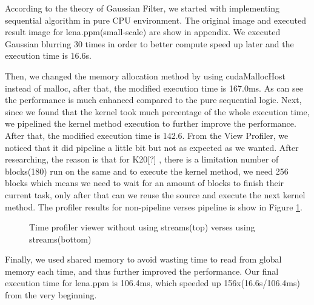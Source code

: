 \documentclass[journal,11pt,onecolumn,draftclsnofoot]{ieeeconf}  %
\begin{document}
According to the theory of Gaussian Filter, we started with implementing sequential algorithm in pure CPU environment. The original image and executed result image for lena.ppm(small-scale) are show in appendix. We executed Gaussian blurring 30 times in order to better compute speed up later and the execution time is 16.6s.

Then, we changed the memory allocation method by using cudaMallocHost instead of malloc, after that, the modified execution time is 167.0ms. As can see the performance is much enhanced compared to the pure sequential logic.
Next, since we found that the kernel took much percentage of the whole execution time, we pipelined the kernel method execution to further improve the performance. After that, the modified execution time is 142.6. From the View Profiler, we noticed that it did pipeline a little bit but not as expected as we wanted. After researching, the reason is that for K20[?] , there is a limitation number of blocks(180) run on the same and to execute the kernel method, we need 256 blocks which means we need to wait for an amount of blocks to finish their current task, only after that can we reuse the source and execute the next kernel method. The profiler results for non-pipeline verses pipeline is show in Figure \ref{viewer}.

\begin{figure}[!tbp]
	\centering
	\begin{minipage}[b]{1\textwidth}
	\end{minipage}
	\begin{minipage}[b]{1\textwidth}
	\end{minipage}
	
	\caption{Time profiler viewer without using streams(top) verses using streams(bottom)}
	\label{viewer}
\end{figure}
Finally, we used shared memory to avoid wasting time to read from global memory each time, and thus further improved the performance. Our final execution time for lena.ppm is 106.4ms, which speeded up 156x(16.6s/106.4ms) from the very beginning.
\end{document}

